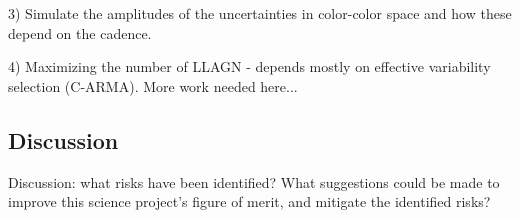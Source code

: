 
3) Simulate the amplitudes of the uncertainties in color-color space and how
these depend on the cadence.

4) Maximizing the number of LLAGN - depends mostly on effective variability selection
(C-ARMA). More work needed here...


\subsection{Discussion}
\label{sec:\secname:discussion}

Discussion: what risks have been identified? What suggestions could be
made to improve this science project's figure of merit, and mitigate
the identified risks?



\navigationbar
